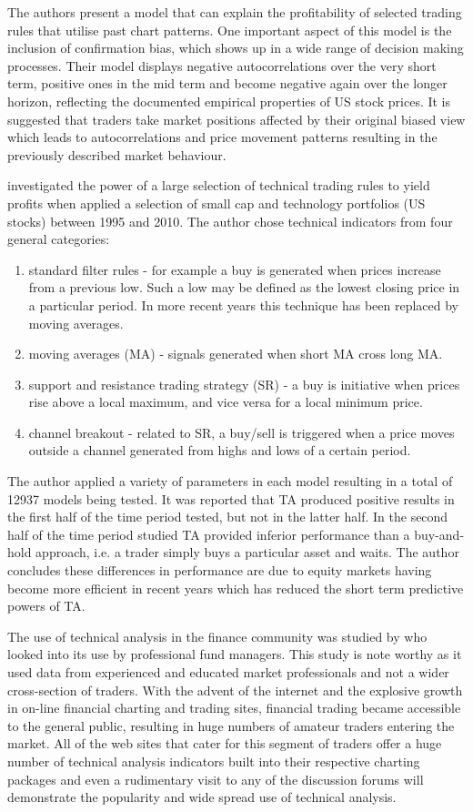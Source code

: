 The authors present a model that can explain the profitability of selected trading rules that utilise past chart patterns. One important aspect of this model is the inclusion of confirmation bias, which shows up in a wide range of decision making processes. Their model displays negative autocorrelations over the very short term, positive ones in the
mid term and become negative again over the longer horizon, reflecting the documented empirical properties of US stock prices.  It is suggested that traders take market positions affected by their original biased view which leads to autocorrelations and price movement patterns resulting in the previously described market behaviour.

\cite{Shynkevich2012193} investigated the power of a large selection of technical trading rules to yield profits when applied a selection of small cap and technology portfolios (US stocks) between 1995 and 2010. The author chose technical indicators from four general categories:
\begin{enumerate}
\item standard filter rules - for example a buy is generated when prices increase from a previous low. Such a low may be defined as the lowest closing price in a particular period. In more recent years this technique has been replaced by moving averages. 
\item  moving averages (MA) - signals generated when short MA cross long MA. 
\item  support and resistance trading strategy (SR) - a buy is initiative when prices rise above a local maximum, and vice versa for a local minimum price.
\item  channel breakout - related to SR, a buy/sell is triggered when a price moves outside a channel generated from highs and lows of a certain period.
\end{enumerate}
The author applied a variety of parameters in each model resulting in a total of 12937 models being tested. It was reported that TA produced positive results in the first half of the time period tested, but not in the latter half. In the second half of the time period studied TA provided inferior performance than a buy-and-hold approach, i.e. a trader simply buys a particular asset and waits. The author concludes these differences in performance are due to equity markets having become more efficient in recent years which has reduced the short term predictive powers of TA.

The use of technical analysis in the finance community was studied by \cite{Menkhoff20102573} who looked into its use by professional fund managers. This study is note worthy as it used data from experienced and educated market professionals and not a wider cross-section of traders. With the advent of the internet and the explosive growth in on-line financial charting and trading sites, financial  trading became accessible to the general public, resulting in huge numbers of amateur traders entering the market. All of the web sites that cater for this segment of traders offer a huge number of technical analysis indicators built into their respective charting packages and even a rudimentary visit to any of the discussion forums will demonstrate the popularity and wide spread use of technical analysis. 
 
